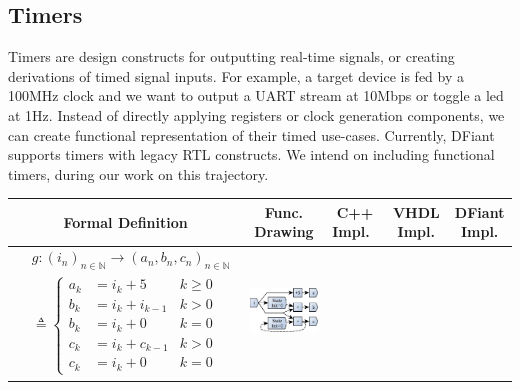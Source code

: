 \subsection{Timers}
Timers are design constructs for outputting real-time signals, or creating derivations of timed signal inputs. For example, a target device is fed by a 100MHz clock and we want to output a UART stream at 10Mbps or toggle a led at 1Hz. Instead of directly applying registers or clock generation components, we can create functional representation of their timed use-cases. Currently, DFiant supports timers with legacy RTL constructs. We intend on including functional timers, during our work on this trajectory.

\begin{table}
  \centering
  \label{tbl:StateExDefImpl}
	\begin{threeparttable}
    \scriptsize
		\setlength\tabcolsep{2pt}
		\begin{tabular}{|c|c|c|c|c|}
			\hline 
			\textbf{Formal Definition} & \textbf{Func. Drawing} & \textbf{C++ Impl.}\tnote{†}~\tnote{‡} & \textbf{VHDL Impl.}\tnote{‡} & \textbf{DFiant Impl.} \\ 
			\hline
			\begin{minipage}[b][3.1cm][c]{0.25\linewidth}
				{\fontsize{7}{8}\selectfont
					\begin{equation}
					\nonumber
					\begin{split}
					&g:(i_{n})_{n\in \mathbb{N}}\rightarrow (a_n,b_n,c_n)_{n\in \mathbb{N}}\\  
					&\triangleq\left\{
					\begin{aligned}
					a_k &= i_k+5 & k\geq 0\\ 
					b_k &= i_k+i_{k-1} & k>0 \\   
					b_k &= i_k+0  & k=0 \\
					c_k &= i_k+c_{k-1} & k>0  \\ 
					c_k &= i_k+0 & k=0
					\end{aligned} 
					\right.
					\end{split}
					\end{equation}
				}
			\end{minipage}
			&
			\begin{minipage}[b][3.1cm][c]{0.18\linewidth}
				\includegraphics[width=\linewidth]{graphics/gFuncDraw.pdf}

\end{minipage}
\end{tabular}
\end{threeparttable}
\end{table}
